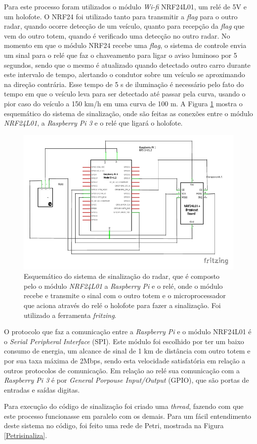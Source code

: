 Para este processo foram utilizados o módulo \emph{Wi-fi} NRF24L01, um relé de 5V e um holofote. O NRF24 foi utilizado tanto para transmitir a \emph{flag} para o outro radar, quando ocorre detecção de um veículo, quanto para recepção da \emph{flag} que vem do outro totem, quando é verificado uma detecção no outro radar. No momento em que o módulo NRF24 recebe uma \emph {flag}, o sistema de controle envia um sinal para o relé que faz o chaveamento para ligar o aviso luminoso por 5 segundos, sendo que o mesmo é atualizado quando detectado outro carro durante este intervalo de tempo, alertando o condutor sobre um veículo se aproximando na direção contrária. Esse tempo de 5 s de iluminação é necessário pelo fato do tempo em que o veículo leva para ser detectado até passar pela curva, usando o pior caso do veículo a 150 km/h em uma curva de 100 m.
A Figura \ref{esquematico} mostra o esquemático do sistema de sinalização, onde são feitas as conexões entre o módulo \emph{NRF24L01}, a \emph{Raspberry Pi 3} e o relé que ligará o holofote.

\begin{figure}[H]
    \centering
    \includegraphics[scale = 0.8]{figuras/esquematico.pdf}
    \caption{Esquemático do sistema de sinalização do radar, que é composto pelo o módulo \emph{NRF24L01} a \emph{Raspberry Pi} e o relé, onde o módulo recebe e transmite o sinal com o outro totem e o microprocessador que aciona através do relé o holofote para fazer a sinalização. Foi utilizado a ferramenta \emph{fritzing}.}
    \label{esquematico}
\end{figure}
   
O protocolo que faz a comunicação entre a \emph{Raspberry Pi} e o módulo NRF24L01 é o \emph{Serial Peripheral Interface} (SPI). Este módulo foi escolhido por ter um baixo consumo de energia, um alcance de sinal de 1 km de distância com outro totem e por sua taxa máxima de 2Mbps, sendo esta velocidade satisfatória em relação a outros protocolos de comunicação. Em relação ao relé sua comunicação com a \emph{Raspberry Pi 3} é por \emph{General Porpouse Input/Output} (GPIO), que são portas de entradas e saídas digitas.  \par
Para execução do código de sinalização foi criado uma \emph{thread}, fazendo com que este processo funcionasse em paralelo com os demais. Para um fácil entendimento deste sistema no código, foi feito uma rede de Petri, mostrada na Figura \ref{Petrisinaliza}.

